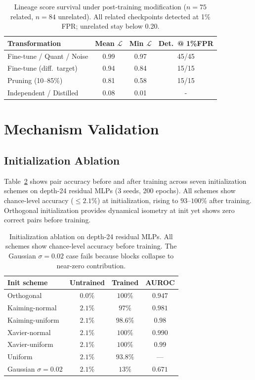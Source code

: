 \begin{table}[h]
\centering
\small
\begin{tabular}{@{}lccc@{}}
\toprule
Transformation & Mean $\mathcal{L}$ & Min $\mathcal{L}$ & Det.\ @ 1\%FPR \\
\midrule
Fine-tune / Quant / Noise & 0.99 & 0.97 & 45/45 \\
Fine-tune (diff.\ target) & 0.94 & 0.84 & 15/15 \\
Pruning (10--85\%) & 0.81 & 0.58 & 15/15 \\
\midrule
Independent / Distilled & 0.08 & 0.01 & - \\
\bottomrule
\end{tabular}
\caption{Lineage score survival under post-training modification ($n{=}75$ related, $n{=}84$ unrelated). All related checkpoints detected at 1\% FPR; unrelated stay below 0.20.}
\label{tab:survival}
\end{table}

\section{Mechanism Validation}\label{app:mechanism}

\subsection{Initialization Ablation}\label{app:init-ablation}

Table~\ref{tab:init-ablation} shows pair accuracy before and after training across seven initialization schemes on depth-24 residual MLPs (3 seeds, 200 epochs). All schemes show chance-level accuracy (${\leq}2.1\%$) at initialization, rising to $93$--$100\%$ after training. Orthogonal initialization provides dynamical isometry at init yet shows zero correct pairs before training.

\begin{table}[h]
\centering
\small
\begin{tabular}{@{}lccc@{}}
\toprule
Init scheme & Untrained & Trained & AUROC \\
\midrule
Orthogonal       & $0.0\%$  & $100\%$ & $0.947$ \\
Kaiming-normal   & $2.1\%$  & $97\%$  & $0.981$ \\
Kaiming-uniform  & $2.1\%$  & $98.6\%$ & $0.98$ \\
Xavier-normal    & $2.1\%$  & $100\%$ & $0.990$ \\
Xavier-uniform   & $2.1\%$  & $100\%$ & $0.99$ \\
Uniform          & $2.1\%$  & $93.8\%$ & --- \\
Gaussian $\sigma{=}0.02$ & $2.1\%$ & $13\%$ & $0.671$ \\
\bottomrule
\end{tabular}
\caption{Initialization ablation on depth-24 residual MLPs. All schemes show chance-level accuracy before training. The Gaussian $\sigma{=}0.02$ case fails because blocks collapse to near-zero contribution.}
\label{tab:init-ablation}
\end{table}

